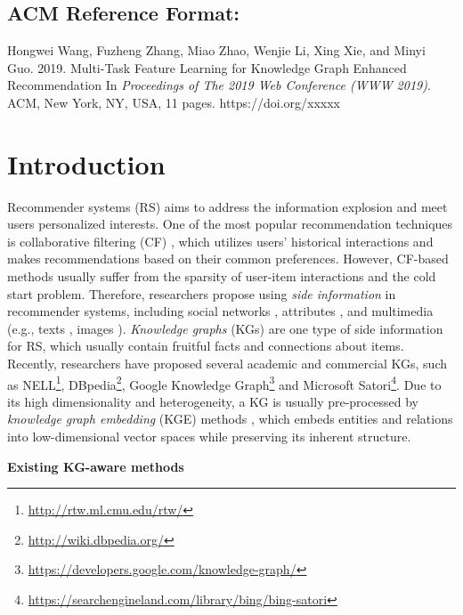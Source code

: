 \documentclass[sigconf]{acmart}
\begin{document}
\subsection*{\small{ACM Reference Format:}}
\vspace{-0.05in}
	{\small
		Hongwei Wang, Fuzheng Zhang, Miao Zhao, Wenjie Li, Xing Xie, and Minyi Guo.
		2019.
		Multi-Task Feature Learning for Knowledge Graph Enhanced Recommendation
		In \textit{Proceedings of The 2019 Web Conference (WWW 2019)}.
		ACM, New York, NY, USA, 11 pages.
		https://doi.org/xxxxx
	}

\section{Introduction}
	Recommender systems (RS) aims to address the information explosion and meet users personalized interests.
	One of the most popular recommendation techniques is collaborative filtering (CF) \cite{koren2009matrix}, which utilizes users' historical interactions and makes recommendations based on their common preferences.
	However, CF-based methods usually suffer from the sparsity of user-item interactions and the cold start problem.
	Therefore, researchers propose using \textit{side information} in recommender systems, including social networks \cite{jamali2010matrix}, attributes \cite{wang2018shine}, and multimedia (e.g., texts \cite{wang2015collaborative}, images \cite{zhang2016collaborative}).
	\textit{Knowledge graphs} (KGs) are one type of side information for RS, which usually contain fruitful facts and connections about items.
	Recently, researchers have proposed several academic and commercial KGs, such as NELL\footnote{\url{http://rtw.ml.cmu.edu/rtw/}}, DBpedia\footnote{\url{http://wiki.dbpedia.org/}}, Google Knowledge Graph\footnote{\url{https://developers.google.com/knowledge-graph/}} and Microsoft Satori\footnote{\url{https://searchengineland.com/library/bing/bing-satori}}.
	Due to its high dimensionality and heterogeneity, a KG is usually pre-processed by \textit{knowledge graph embedding} (KGE) methods \cite{wang2018graphgan}, which embeds entities and relations into low-dimensional vector spaces while preserving its inherent structure.
	
	\vspace{0.5em}
	\noindent\textbf{Existing KG-aware methods}
	
\end{document}

